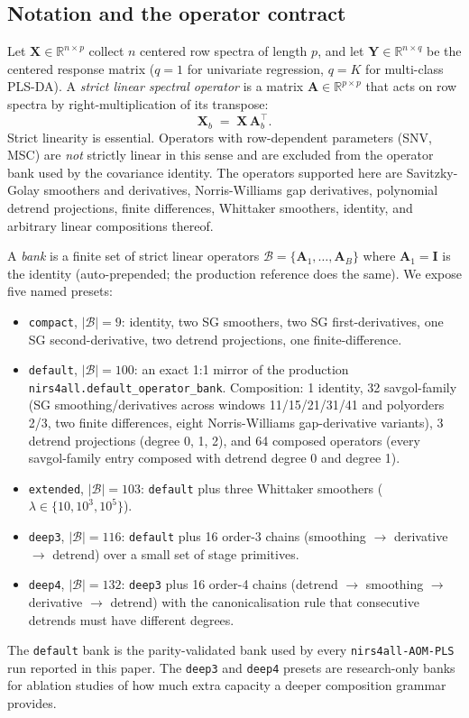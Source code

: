 \documentclass[review,a4paper]{elsarticle}
\newcommand{\R}{\mathbb{R}}
\newcommand{\identity}{\mathbf{I}}
\newcommand{\Xmat}{\mathbf{X}}
\newcommand{\Ymat}{\mathbf{Y}}
\newcommand{\Amat}{\mathbf{A}}
\newcommand{\PLSDA}{\textsc{PLS-DA}\xspace}
\begin{document}
\subsection{Notation and the operator contract}
Let $\Xmat\in\R^{n\times p}$ collect $n$ centered row spectra of length
$p$, and let $\Ymat\in\R^{n\times q}$ be the centered response matrix
($q=1$ for univariate regression, $q=K$ for multi-class \PLSDA). A
\emph{strict linear spectral operator} is a matrix $\Amat\in\R^{p\times
p}$ that acts on row spectra by right-multiplication of its transpose:
\begin{equation}
\Xmat_b \;=\; \Xmat\,\Amat_b^\top.
\label{eq:operator-action}
\end{equation}
Strict linearity is essential. Operators with row-dependent parameters
(SNV, MSC) are \emph{not} strictly linear in this sense and are
excluded from the operator bank used by the covariance identity. The
operators supported here are Savitzky-Golay smoothers and derivatives,
Norris-Williams gap derivatives, polynomial detrend projections, finite
differences, Whittaker smoothers, identity, and arbitrary linear
compositions thereof.

A \emph{bank} is a finite set of strict linear operators
$\mathcal{B}=\{\Amat_1,\dots,\Amat_B\}$ where $\Amat_1=\identity$ is the
identity (auto-prepended; the production reference does the same). We
expose five named presets:
\begin{itemize}[leftmargin=2em]
  \item \texttt{compact}, $|\mathcal{B}|=9$: identity, two SG smoothers,
        two SG first-derivatives, one SG second-derivative, two detrend
        projections, one finite-difference.
  \item \texttt{default}, $|\mathcal{B}|=100$: an exact 1:1 mirror of
        the production \verb|nirs4all.default_operator_bank|. Composition:
        1 identity, 32 savgol-family (SG smoothing/derivatives across
        windows 11/15/21/31/41 and polyorders 2/3, two finite differences,
        eight Norris-Williams gap-derivative variants), 3 detrend
        projections (degree 0, 1, 2), and 64 composed operators (every
        savgol-family entry composed with detrend degree 0 and degree 1).
  \item \texttt{extended}, $|\mathcal{B}|=103$: \texttt{default} plus
        three Whittaker smoothers ($\lambda\in\{10, 10^3, 10^5\}$).
  \item \texttt{deep3}, $|\mathcal{B}|=116$: \texttt{default} plus 16
        order-3 chains (smoothing $\to$ derivative $\to$ detrend) over
        a small set of stage primitives.
  \item \texttt{deep4}, $|\mathcal{B}|=132$: \texttt{deep3} plus 16
        order-4 chains (detrend $\to$ smoothing $\to$ derivative
        $\to$ detrend) with the canonicalisation rule that consecutive
        detrends must have different degrees.
\end{itemize}
The \texttt{default} bank is the parity-validated bank used by every
\verb|nirs4all-AOM-PLS| run reported in this paper. The \texttt{deep3}
and \texttt{deep4} presets are research-only banks for ablation
studies of how much extra capacity a deeper composition grammar
provides.
\end{document}
